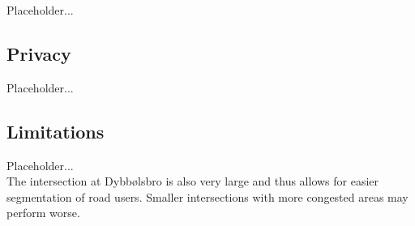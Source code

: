Placeholder...

\subsection{Privacy}
Placeholder...

\subsection{Limitations}
Placeholder...
\ \\
The intersection at Dybbølsbro is also very large and thus allows for easier segmentation of road users. 
Smaller intersections with more congested areas may perform worse. 